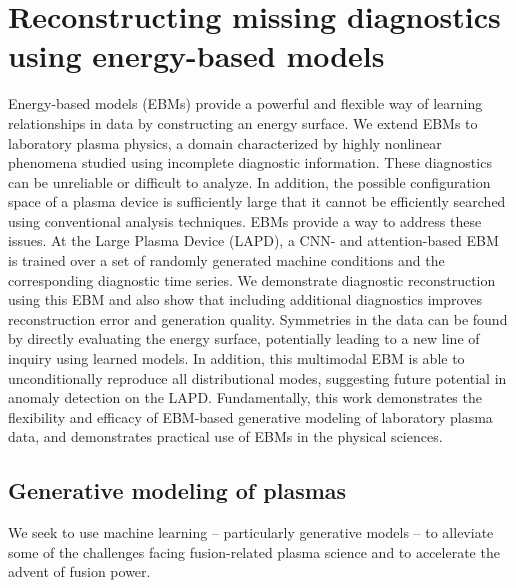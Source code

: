 \graphicspath{{Chapters/Chapter_ebm/}}


\chapter{Reconstructing missing diagnostics using energy-based models}
\label{ch:ebm}

 Energy-based models (EBMs) provide a powerful and flexible way of learning relationships in data by constructing an energy surface. We extend EBMs to laboratory plasma physics, a domain characterized by highly nonlinear phenomena studied using incomplete diagnostic information. These diagnostics can be unreliable or difficult to analyze. In addition, the possible configuration space of a plasma device is sufficiently large that it cannot be efficiently searched using conventional analysis techniques. EBMs provide a way to address these issues. At the Large Plasma Device (LAPD), a CNN- and attention-based EBM is trained over a set of randomly generated machine conditions and the corresponding diagnostic time series. We demonstrate diagnostic reconstruction using this EBM and also show that including additional diagnostics improves reconstruction error and generation quality.
  Symmetries in the data can be found by directly evaluating the energy surface, potentially leading to a new line of inquiry using learned models. In addition, this multimodal EBM is able to unconditionally reproduce all distributional modes, suggesting future potential in anomaly detection on the LAPD. Fundamentally, this work demonstrates the flexibility and efficacy of EBM-based generative modeling of laboratory plasma data, and demonstrates practical use of EBMs in the physical sciences.



\section{Generative modeling of plasmas}

We seek to use machine learning -- particularly generative models -- to alleviate some of the challenges facing fusion-related plasma science and to accelerate the advent of fusion power.

